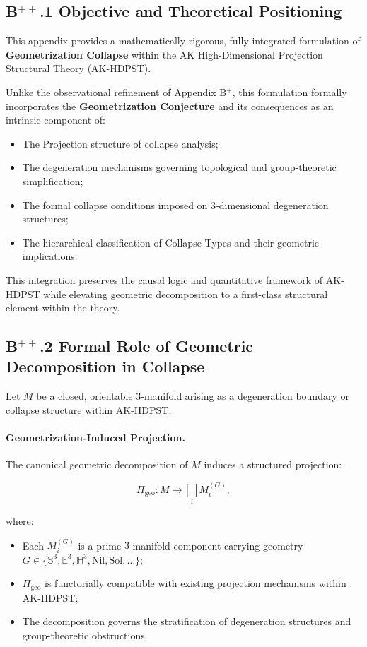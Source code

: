 \documentclass[11pt]{article}
\begin{document}
\subsection*{B$^{++}$.1 Objective and Theoretical Positioning}

This appendix provides a mathematically rigorous, fully integrated formulation of \textbf{Geometrization Collapse} within the AK High-Dimensional Projection Structural Theory (AK-HDPST).

Unlike the observational refinement of Appendix B$^{+}$, this formulation formally incorporates the \textbf{Geometrization Conjecture} and its consequences as an intrinsic component of:

\begin{itemize}
    \item The Projection structure of collapse analysis;
    \item The degeneration mechanisms governing topological and group-theoretic simplification;
    \item The formal collapse conditions imposed on $3$-dimensional degeneration structures;
    \item The hierarchical classification of Collapse Types and their geometric implications.
\end{itemize}

This integration preserves the causal logic and quantitative framework of AK-HDPST while elevating geometric decomposition to a first-class structural element within the theory.

\subsection*{B$^{++}$.2 Formal Role of Geometric Decomposition in Collapse}

Let $M$ be a closed, orientable $3$-manifold arising as a degeneration boundary or collapse structure within AK-HDPST.

\paragraph{Geometrization-Induced Projection.}  
The canonical geometric decomposition of $M$ induces a structured projection:

\[
\Pi_{\mathrm{geo}} : M \longrightarrow \bigsqcup_i M_i^{(G)},
\]

where:

\begin{itemize}
    \item Each $M_i^{(G)}$ is a prime $3$-manifold component carrying geometry $G \in \{ \mathbb{S}^3, \mathbb{E}^3, \mathbb{H}^3, \mathrm{Nil}, \mathrm{Sol}, \ldots \}$;
    \item $\Pi_{\mathrm{geo}}$ is functorially compatible with existing projection mechanisms within AK-HDPST;
    \item The decomposition governs the stratification of degeneration structures and group-theoretic obstructions.
\end{itemize}
\end{document}
